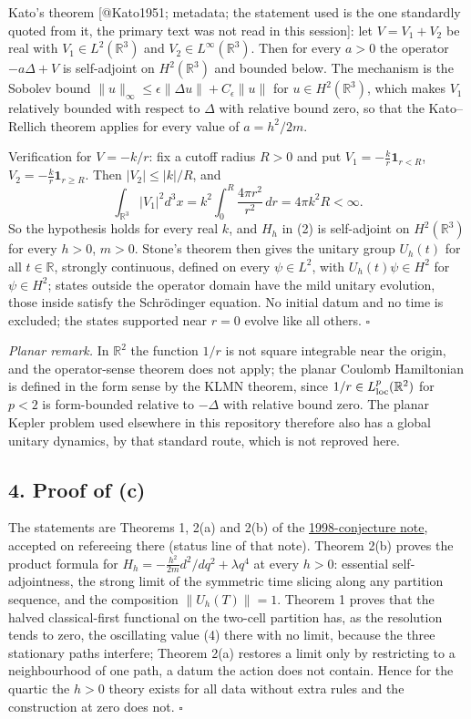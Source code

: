 \documentclass[11pt,a4paper]{article}
\begin{document}
Kato's theorem {[}@Kato1951; metadata; the statement used is the one
standardly quoted from it, the primary text was not read in this
session{]}: let \(V=V_1+V_2\) be real with \(V_1\in L^2(\mathbb R^3)\)
and \(V_2\in L^\infty(\mathbb R^3)\). Then for every \(a>0\) the
operator \(-a\Delta+V\) is self-adjoint on \(H^2(\mathbb R^3)\) and
bounded below. The mechanism is the Sobolev bound
\(\|u\|_\infty\le\epsilon\|\Delta u\|+C_\epsilon\|u\|\) for
\(u\in H^2(\mathbb R^3)\), which makes \(V_1\) relatively bounded with
respect to \(\Delta\) with relative bound zero, so that the
Kato--Rellich theorem applies for every value of \(a=h^2/2m\).

Verification for \(V=-k/r\): fix a cutoff radius \(R>0\) and put
\(V_1=-\tfrac kr\mathbf 1_{r<R}\), \(V_2=-\tfrac kr\mathbf 1_{r\ge R}\).
Then \(|V_2|\le|k|/R\), and
\[\int_{\mathbb R^3}|V_1|^2d^3x=k^2\int_0^R\frac{4\pi r^2}{r^2}\,dr=4\pi k^2R<\infty.\]
So the hypothesis holds for every real \(k\), and \(H_h\) in (2) is
self-adjoint on \(H^2(\mathbb R^3)\) for every \(h>0\), \(m>0\). Stone's
theorem then gives the unitary group \(U_h(t)\) for all
\(t\in\mathbb R\), strongly continuous, defined on every
\(\psi\in L^2\), with \(U_h(t)\psi\in H^2\) for \(\psi\in H^2\); states
outside the operator domain have the mild unitary evolution, those
inside satisfy the Schrödinger equation. No initial datum and no time is
excluded; the states supported near \(r=0\) evolve like all others.
\(\square\)

\emph{Planar remark.} In \(\mathbb R^2\) the function \(1/r\) is not
square integrable near the origin, and the operator-sense theorem does
not apply; the planar Coulomb Hamiltonian is defined in the form sense
by the KLMN theorem, since \(1/r\in L^p_{\rm loc}(\mathbb R^2)\) for
\(p<2\) is form-bounded relative to \(-\Delta\) with relative bound
zero. The planar Kepler problem used elsewhere in this repository
therefore also has a global unitary dynamics, by that standard route,
which is not reproved here.

\subsection{4. Proof of (c)}\label{proof-of-c}

The statements are Theorems 1, 2(a) and 2(b) of the
\href{rivero-1998-conjecture-central-forces.md}{1998-conjecture note},
accepted on refereeing there (status line of that note). Theorem 2(b)
proves the product formula for
\(H_h=-\tfrac{h^2}{2m}d^2/dq^2+\lambda q^4\) at every \(h>0\): essential
self-adjointness, the strong limit of the symmetric time slicing along
any partition sequence, and the composition \(\|U_h(T)\|=1\). Theorem 1
proves that the halved classical-first functional on the two-cell
partition has, as the resolution tends to zero, the oscillating value
(4) there with no limit, because the three stationary paths interfere;
Theorem 2(a) restores a limit only by restricting to a neighbourhood of
one path, a datum the action does not contain. Hence for the quartic the
\(h>0\) theory exists for all data without extra rules and the
construction at zero does not. \(\square\)
\end{document}

